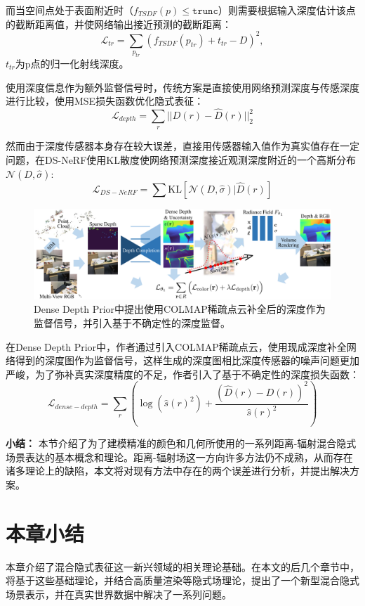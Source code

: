 而当空间点处于表面附近时（$f_{TSDF}(p) \leq \mathtt{trunc}$）则需要根据输入深度估计该点的截断距离值，并使网络输出接近预测的截断距离：
\begin{equation}
    \mathcal{L}_{tr} = \sum_{p_{tr}}(f_{TSDF}(p_{tr})+t_{tr}-D)^2,
\end{equation}
$t_{tr}$为p点的归一化射线深度。

使用深度信息作为额外监督信号时，传统方案是直接使用网络预测深度与传感深度进行比较，使用MSE损失函数优化隐式表征：
\begin{equation}
    \mathcal{L}_{depth}=\sum_r||D(r)-\hat{D}(r)||_2^2
\end{equation}

然而由于深度传感器本身存在较大误差，直接用传感器输入值作为真实值存在一定问题，在DS-NeRF\cite{deng_depth-supervised_2022}使用KL散度使网络预测深度接近观测深度附近的一个高斯分布$\mathcal{N}(D, \hat{\sigma})$:
\begin{equation}
    \mathcal{L}_{DS-NeRF} = \sum\text{KL}[\mathcal{N}(D,\hat{\sigma}) | \hat{D}(r)]
\end{equation}

\begin{figure}[ht]
    \centering
    \includegraphics[width=\textwidth]{undergraduate-thesis/images/related-work/dense-depth prior.png}
    \caption{Dense Depth Prior\cite{roessle_dense_2022}中提出使用COLMAP\cite{schonberger_structure--motion_2016}稀疏点云补全后的深度作为监督信号，并引入基于不确定性的深度监督。}
    \label{fig:related-work dense depth prior}
\end{figure}

在Dense Depth Prior\cite{roessle_dense_2022}中，作者通过引入COLMAP\cite{schonberger_structure--motion_2016}稀疏点云，使用现成深度补全网络得到的深度图作为监督信号，这样生成的深度图相比深度传感器的噪声问题更加严峻，为了弥补真实深度精度的不足，作者引入了基于不确定性的深度损失函数：
\begin{equation}
    \mathcal{L}_{dense-depth}=\sum_r\left(\log(\hat{s}(r)^2)+\frac{(\hat{D}(r)-D(r))^2}{\hat{s}(r)^2}\right)
\end{equation}

\noindent\textbf{小结：} 本节介绍了为了建模精准的颜色和几何所使用的一系列距离-辐射混合隐式场景表达的基本概念和理论。距离-辐射场这一方向许多方法仍不成熟，从而存在诸多理论上的缺陷，本文将对现有方法中存在的两个误差进行分析，并提出解决方案。

\section{本章小结}
本章介绍了混合隐式表征这一新兴领域的相关理论基础。在本文的后几个章节中，将基于这些基础理论，并结合高质量渲染等隐式场理论，提出了一个新型混合隐式场景表示，并在真实世界数据中解决了一系列问题。